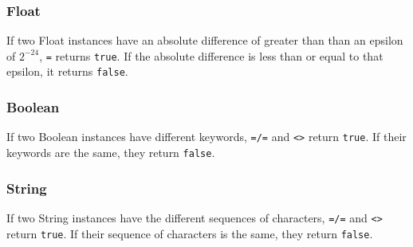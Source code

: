\subsubsection{Float}
If two Float instances have an absolute difference of greater than than an epsilon of $2^{-24}$, \verb!=! returns \verb!true!. If the absolute difference is less than or equal to that epsilon, it returns \verb!false!.
\subsubsection{Boolean}
If two Boolean instances have different keywords, \verb!=/=! and \verb!<>! return \verb!true!. If their keywords are the same, they return \verb!false!.
\subsubsection{String}
If two String instances have the different sequences of characters, \verb!=/=! and \verb!<>! return \verb!true!. If their sequence of characters is the same, they return \verb!false!.